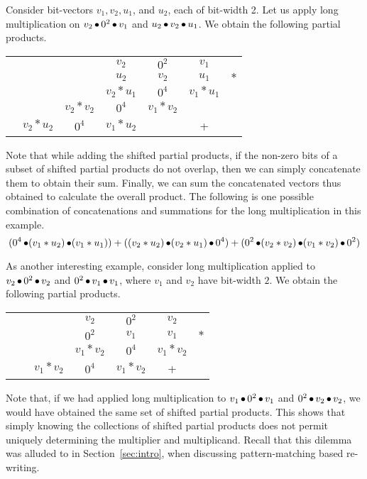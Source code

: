 \begin{example}
  Consider bit-vectors $v_1,v_2,u_1$, and $u_2$, each of bit-width 2.
  Let us apply long multiplication on
  $v_2 \mathop{\bullet} 0^2 \mathop{\bullet} v_1$ and $u_2 \mathop{\bullet} v_2 \mathop{\bullet} u_1$.
  We obtain the following partial products.
\begin{center}
  \vspace{-2ex}
\begin{tabular}{c@{\quad}c@{\quad}c@{\quad}c@{\quad}c@{\quad}c@{\quad}c}
  &&& $v_2$ & $0^2$ & $v_1$&\\ 
  &&& $u_2$ & $v_2$ & $u_1$&$*$\\ \hline
  &&&$v_2*u_1$& $0^4$ & $v_1*u_1$&\\
  &&$v_2*v_2$&$0^4$& $v_1*v_2$ && \\
  &$v_2*u_2$& $0^4$ &$v_1*u_2$&  & +&\\\hline
\end{tabular}
\end{center}
Note that while adding the shifted partial products, if the non-zero
bits of a subset of shifted partial products do not overlap, then we
can simply concatenate them to obtain their sum. Finally, we can sum
the concatenated vectors thus obtained to calculate the overall
product. The following is one possible combination of 
concatenations and summations for the long multiplication in this
example.
%
\vspace{-1ex}
$$
( 0^4 \concat (v_1*u_2) \concat (v_1*u_1)) +
((v_2*u_2) \concat (v_2*u_1) \concat 0^4) +
(0^2 \concat (v_2*v_2) \concat (v_1*v_2) \concat 0^2)
\vspace{-1ex}
$$
\end{example}

\begin{example}

  As another interesting example, consider long multiplication applied to 
  $v_2 \mathop{\bullet} 0^2 \mathop{\bullet} v_2$ and $0^2 \mathop{\bullet} v_1 \mathop{\bullet} v_1$, where
  $v_1$ and $v_2$ have bit-width $2$.
  We obtain the following partial products.
\begin{center}
\begin{tabular}{c@{\quad}c@{\quad}c@{\quad}c@{\quad}c@{\quad}c@{\quad}c}
  &&& $v_2$ & $0^2$ & $v_2$&\\ 
  &&& $0^2$ & $v_1$ & $v_1$&$*$\\ \hline
  &&&$v_1*v_2$& $0^4$ & $v_1*v_2$&\\
  &&$v_1*v_2$&$0^4$& $v_1*v_2$ &+&\\\hline
\end{tabular}
\end{center}
Note that, if we had applied long multiplication to $v_1 \mathop{\bullet} 0^2
\mathop{\bullet} v_1$ and $0^2 \mathop{\bullet} v_2 \mathop{\bullet} v_2$, we would have obtained
the same set of shifted partial products. This shows that simply
knowing the collections of shifted partial products does not permit
uniquely determining the multiplier and multiplicand. Recall that
this dilemma was alluded to in Section~\ref{sec:intro}, when discussing
pattern-matching based re-writing.

\end{example}

